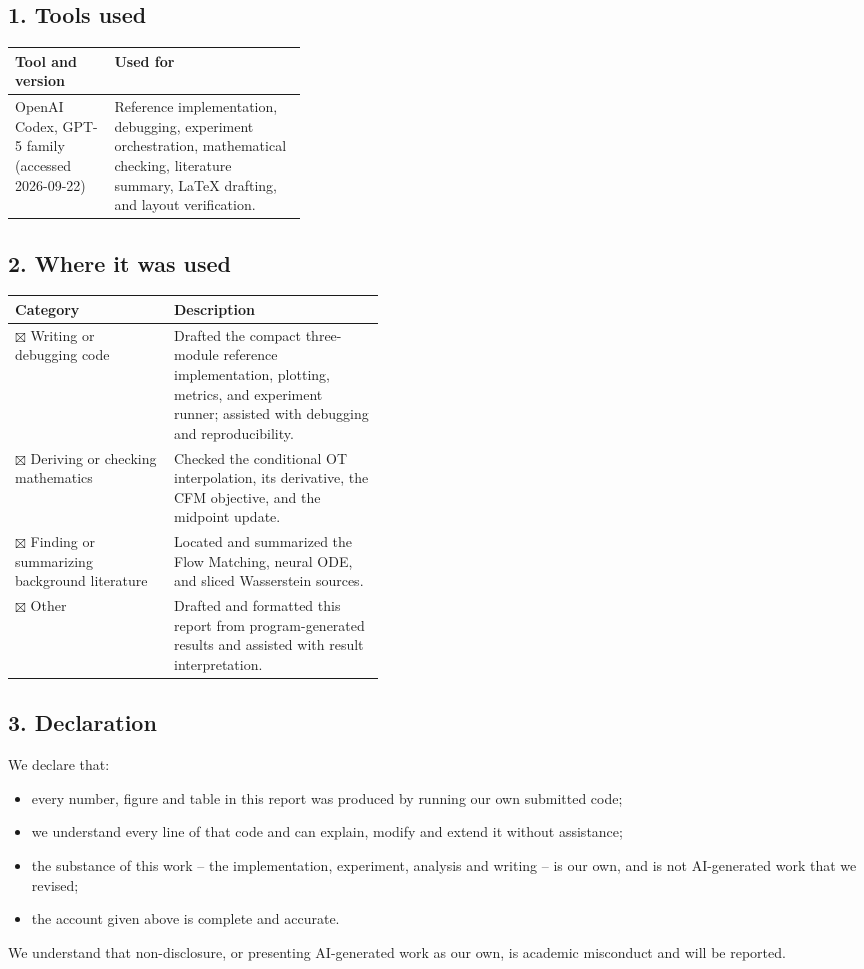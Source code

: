 \documentclass{article}
\begin{document}
\subsection*{1. Tools used}

\begin{tabularx}{\linewidth}{@{}p{0.34\linewidth}X@{}}
  \toprule
  Tool and version & Used for \\
  \midrule
  OpenAI Codex, GPT-5 family (accessed 2026-09-22) & Reference implementation, debugging, experiment orchestration, mathematical checking, literature summary, LaTeX drafting, and layout verification. \\
  \bottomrule
\end{tabularx}

\subsection*{2. Where it was used}

\begin{tabularx}{\linewidth}{@{}p{0.43\linewidth}X@{}}
  \toprule
  Category & Description \\
  \midrule
  $\boxtimes$ Writing or debugging code & Drafted the compact three-module reference implementation, plotting, metrics, and experiment runner; assisted with debugging and reproducibility. \\
  $\boxtimes$ Deriving or checking mathematics & Checked the conditional OT interpolation, its derivative, the CFM objective, and the midpoint update. \\
  $\boxtimes$ Finding or summarizing background literature & Located and summarized the Flow Matching, neural ODE, and sliced Wasserstein sources. \\
  $\boxtimes$ Other & Drafted and formatted this report from program-generated results and assisted with result interpretation. \\
  \bottomrule
\end{tabularx}

\subsection*{3. Declaration}

We declare that:
\begin{itemize}
  \item every number, figure and table in this report was produced by running our own submitted code;
  \item we understand every line of that code and can explain, modify and extend it without assistance;
  \item the substance of this work -- the implementation, experiment, analysis and writing -- is our own, and is not AI-generated work that we revised;
  \item the account given above is complete and accurate.
\end{itemize}
We understand that non-disclosure, or presenting AI-generated work as our own, is academic misconduct and will be reported.
\end{document}

